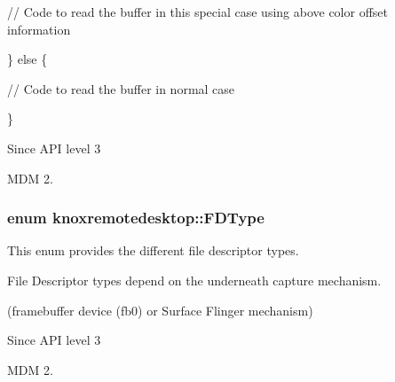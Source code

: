 \begin{DoxyPre}		   // Code to read the buffer in this special case using above color offset information\end{DoxyPre}



\begin{DoxyPre}		\} else \{\end{DoxyPre}



\begin{DoxyPre}			// Code to read the buffer in normal case\end{DoxyPre}



\begin{DoxyPre}		\}\end{DoxyPre}



\begin{DoxyPre}      \end{DoxyPre}


\par


\begin{DoxySince}{\-Since}
\-A\-P\-I level 3

\-M\-D\-M 2. 
\end{DoxySince}
\hypertarget{namespaceknoxremotedesktop_a01c73ba2fbebc2395aae6198eb87a416}{
\subsubsection[{\-F\-D\-Type}]{\setlength{\rightskip}{0pt plus 5cm}enum {\bf knoxremotedesktop\-::\-F\-D\-Type}}}\label{namespaceknoxremotedesktop_a01c73ba2fbebc2395aae6198eb87a416}


\-This enum provides the different file descriptor types. 

\-File \-Descriptor types depend on the underneath capture mechanism.

(framebuffer device (fb0) or \-Surface \-Flinger mechanism)

\par


\begin{DoxySince}{\-Since}
\-A\-P\-I level 3

\-M\-D\-M 2. 
\end{DoxySince}
